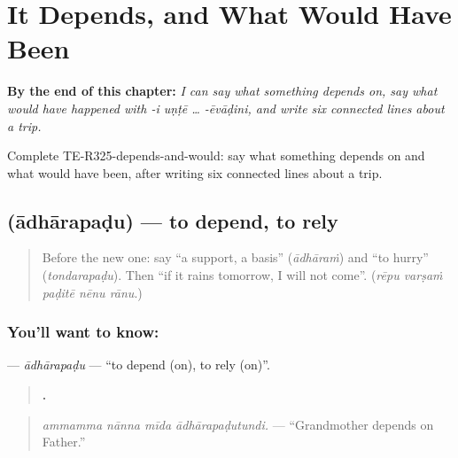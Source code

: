 
\chapter{It Depends, and What Would Have Been}
\label{ch:te-it-depends-and-what-would-have-been}

\begin{chapteropening}
\textbf{By the end of this chapter:} \emph{I can say what something depends on, say what would have happened with -i uṇṭē … -ēvāḍini, and write six connected lines about a trip.}

Complete TE-R325-depends-and-would: say what something depends on and what would have been, after writing six connected lines about a trip.
\end{chapteropening}

\section[\texorpdfstring{\te{ఆధారపడు} (ādhārapaḍu)}{ఆధారపడు (ādhārapaḍu)}]{ (ādhārapaḍu) — to depend, to rely}

\label{lesson:TE-C325-adharapadu}



\begin{quote}
Before the new one: say \textquotedblleft{}a support, a basis\textquotedblright{} (\emph{ādhāraṁ}) and \textquotedblleft{}to hurry\textquotedblright{} (\emph{tondarapaḍu}). Then \textquotedblleft{}if it rains tomorrow, I will not come\textquotedblright{}. (\emph{rēpu varṣaṁ paḍitē nēnu rānu}.)
\end{quote}

\subsection*{You'll want to know: }
\textbf{} — \emph{ādhārapaḍu} — \textquotedblleft{}to depend (on), to rely (on)\textquotedblright{}.

\begin{quote}
\textbf{   .}
\end{quote}

\begin{quote}
\emph{ammamma nānna mīda ādhārapaḍutundi.} — \textquotedblleft{}Grandmother depends on Father.\textquotedblright{}
\end{quote}

